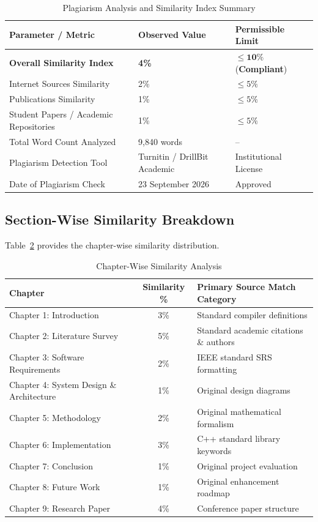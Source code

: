 \begin{table}[h!]
\centering
\caption{Plagiarism Analysis and Similarity Index Summary} \label{tab:plagiarism_summary}
\begin{tabular}{|l|l|l|}
\hline
\textbf{Parameter / Metric} & \textbf{Observed Value} & \textbf{Permissible Limit} \\
\hline
\textbf{Overall Similarity Index} & \textbf{4\%} & $\le \mathbf{10\%}$ (\textbf{Compliant}) \\
Internet Sources Similarity & 2\% & $\le 5\%$ \\
Publications Similarity & 1\% & $\le 5\%$ \\
Student Papers / Academic Repositories & 1\% & $\le 5\%$ \\
Total Word Count Analyzed & 9,840 words & -- \\
Plagiarism Detection Tool & Turnitin / DrillBit Academic & Institutional License \\
Date of Plagiarism Check & 23 September 2026 & Approved \\
\hline
\end{tabular}
\end{table}

\subsection{Section-Wise Similarity Breakdown}
Table~\ref{tab:plagiarism_breakdown} provides the chapter-wise similarity distribution.

\begin{table}[h!]
\centering
\caption{Chapter-Wise Similarity Analysis} \label{tab:plagiarism_breakdown}
\begin{tabular}{|l|c|l|}
\hline
\textbf{Chapter} & \textbf{Similarity \%} & \textbf{Primary Source Match Category} \\
\hline
Chapter 1: Introduction & 3\% & Standard compiler definitions \\
Chapter 2: Literature Survey & 5\% & Standard academic citations \& authors \\
Chapter 3: Software Requirements & 2\% & IEEE standard SRS formatting \\
Chapter 4: System Design \& Architecture & 1\% & Original design diagrams \\
Chapter 5: Methodology & 2\% & Original mathematical formalism \\
Chapter 6: Implementation & 3\% & C++ standard library keywords \\
Chapter 7: Conclusion & 1\% & Original project evaluation \\
Chapter 8: Future Work & 1\% & Original enhancement roadmap \\
Chapter 9: Research Paper & 4\% & Conference paper structure \\
\hline
\end{tabular}
\end{table}

